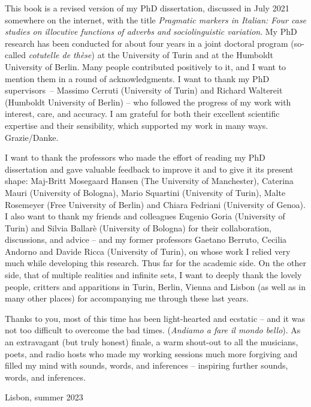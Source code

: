 \addchap{\lsAcknowledgementTitle} 

\hypertarget{Toc124860605}{}
This book is a revised version of my PhD dissertation, discussed in  {July 2021} somewhere on the internet, with the title \textit{Pragmatic markers in Italian: Four case studies on illocutive functions of adverbs and sociolinguistic variation}. My PhD research has been conducted for about four years in a joint doctoral program (so-called \textit{cotutelle de thèse}) at the University of Turin and at the Humboldt University of Berlin. Many people contributed positively to it, and I want to mention them in a round of acknowledgments. I want to thank my PhD supervisors~– Massimo Cerruti (University of Turin) and Richard Waltereit (Humboldt University of Berlin) – who followed the progress of my work with interest, care, and accuracy. I am grateful for both their excellent scientific expertise and their sensibility, which supported my work in many ways. Grazie/Danke.

I want to thank the professors who made the effort of reading my PhD dissertation and gave valuable feedback to improve it and to give it its present shape: Maj-Britt Mosegaard Hansen (The University of Manchester), Caterina Mauri (University of Bologna), Mario Squartini (University of Turin), Malte Rosemeyer (Free University of Berlin) and Chiara Fedriani (University of Genoa).  I also want to thank my friends and colleagues Eugenio Goria (University of Turin) and Silvia Ballarè (University of Bologna) for their collaboration, discussions, and advice – and my former professors Gaetano Berruto, Cecilia Andorno and Davide Ricca (University of Turin), on whose work I relied very much while developing this research. Thus far for the academic side. On the other side, that of multiple realities and infinite sets, I want to deeply thank the lovely people, critters and apparitions in Turin, Berlin, Vienna and Lisbon (as well as in many other places) for accompanying me through these last years.

Thanks to you, most of this time has been light-hearted and ecstatic – and it was not too difficult to overcome the bad times. (\textit{Andiamo a fare il mondo bello}). As an extravagant (but truly honest) finale, a warm shout-out to all the musicians, poets, and radio hosts who made my working sessions much more forgiving and filled my mind with sounds, words, and inferences – inspiring further sounds, words, and inferences.\bigskip

\hfill Lisbon, summer 2023




